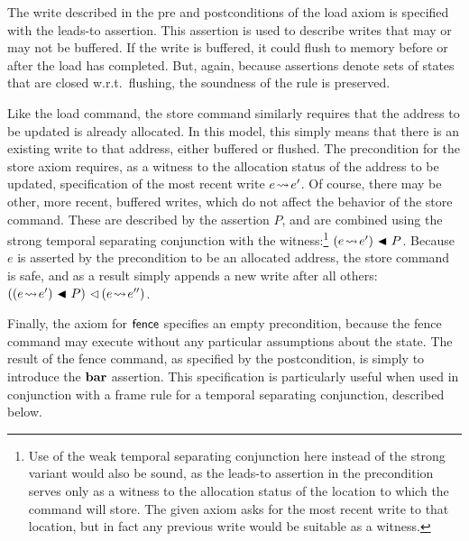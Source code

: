 \documentclass[11pt]{report}
\begin{document}
The write described in the pre and postconditions of the load axiom is specified with the leads-to assertion. This assertion is used to describe writes that may or may not be buffered. If the write is buffered, it could flush to memory before or after the load has completed. But, again, because assertions denote sets of states that are closed w.r.t.\ flushing, the soundness of the rule is preserved. 

Like the load command, the store command similarly requires that the address to be updated is already allocated. In this model, this simply means that there is an existing write to that address, either buffered or flushed. The precondition for the store axiom requires, as a witness to the allocation status of the address to be updated, specification of the most recent write $e \!\leadsto\! e'$. Of course, there may be other, more recent, buffered writes, which do not affect the behavior of the store command. These are described by the assertion $P$, and are combined using the strong temporal separating conjunction with the witness:\footnote{Use of the weak temporal separating conjunction here instead of the strong variant would also be sound, as the leads-to assertion in the precondition serves only as a witness to the allocation status of the location to which the command will store. The given axiom asks for the most recent write to that location, but in fact any previous write would be suitable as a witness.} $(e \!\leadsto\! e') \operatorname{\,\blacktriangleleft\,} P$. Because $e$ is asserted by the precondition to be an allocated address, the store command is safe, and as a result simply appends a new write after all others: $((e \!\leadsto\! e') \operatorname{\,\blacktriangleleft\,} P) \operatorname{\,\vartriangleleft\,} (e \!\leadsto\! e'')$. 

Finally, the axiom for $\operatorname{\mathsf{fence}}$ specifies an empty precondition, because the fence command may execute without any particular assumptions about the state. The result of the fence command, as specified by the postcondition, is simply to introduce the $\mathbf{bar}$ assertion. This specification is particularly useful when used in conjunction with a frame rule for a temporal separating conjunction, described below. 
\end{document}
